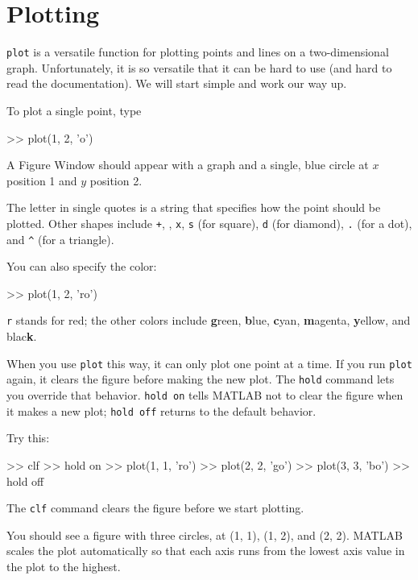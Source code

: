 \documentclass[
]{book}
\numberwithin{Answer}{chapter}
\numberwithin{Exercise}{chapter}
\begin{document}
\section{Plotting}
\label{sect:plotting}

{\tt plot} is a versatile function for plotting points and lines
on a two-dimensional graph.  Unfortunately, it is so versatile
that it can be hard to use (and hard to read the documentation).
We will start simple and work our way up.

To plot a single point, type

\begin{code}
>> plot(1, 2, 'o')
\end{code}

A {\sf Figure Window} should appear with a graph and a single, blue circle
at $x$ position 1 and $y$ position 2.  

The letter in single quotes is a string that specifies how the
point should be plotted.
Other shapes include {\tt +},
{\tt *},
{\tt x},
{\tt s} (for square),
{\tt d} (for diamond), 
{\tt .} (for a dot), and
\verb+^+ (for a triangle).

You can also specify the color:

\begin{code}
>> plot(1, 2, 'ro')
\end{code}

{\tt r} stands for red; the other colors include {\bf g}reen, {\bf
b}lue, {\bf c}yan, {\bf m}agenta, {\bf y}ellow, and blac{\bf k}.

When you use {\tt plot} this way, it can only plot one point at a
time.  If you run {\tt plot} again, it clears the figure before making
the new plot.  The {\tt hold} command lets you override that behavior.
{\tt hold on} tells MATLAB not to clear the figure when it makes a new
plot; {\tt hold off} returns to the default behavior.

Try this:

\begin{code}
>> clf
>> hold on
>> plot(1, 1, 'ro')
>> plot(2, 2, 'go')
>> plot(3, 3, 'bo')
>> hold off
\end{code}

The {\tt clf} command clears the figure before we start plotting.

You should see a figure with three circles, at (1, 1), (1, 2), and (2, 2).  MATLAB scales the plot automatically so that each axis runs from the lowest axis value in the plot to the highest.
\end{document}
